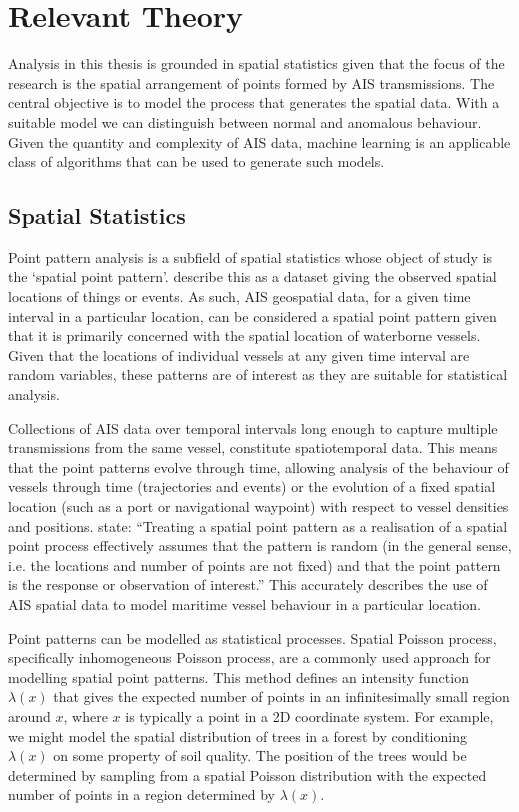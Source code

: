 \documentclass{mldsmsc}
\begin{document}
\section{Relevant Theory}
Analysis in this thesis is grounded in spatial statistics given that the focus of the research is the spatial arrangement of points formed by AIS transmissions. The central objective is to model the process that generates the spatial data. With a suitable model we can distinguish between normal and anomalous behaviour. Given the quantity and complexity of AIS data, machine learning is an applicable class of algorithms that can be used to generate such models.

\subsection{Spatial Statistics}
Point pattern analysis is a subfield of spatial statistics whose object of study is the ‘spatial point pattern’. \cite{baddeley2015spatial} describe this as a dataset giving the observed spatial locations of things or events. As such, AIS geospatial data, for a given time interval in a particular location, can be considered a spatial point pattern given that it is primarily concerned with the spatial location of waterborne vessels. Given that the locations of individual vessels at any given time interval are random variables, these patterns are of interest as they are suitable for statistical analysis.

Collections of AIS data over temporal intervals long enough to capture multiple transmissions from the same vessel, constitute spatiotemporal data. This means that the point patterns evolve through time, allowing analysis of the behaviour of vessels through time (trajectories and events) or the evolution of a fixed spatial location (such as a port or navigational waypoint) with respect to vessel densities and positions.
\cite{baddeley2015spatial} state: “Treating a spatial point pattern as a realisation of a spatial point process effectively assumes that the pattern is random (in the general sense, i.e. the locations and number of points are not fixed) and that the point pattern is the response or observation of interest.” This accurately describes the use of AIS spatial data to model maritime vessel behaviour in a particular location.

Point patterns can be modelled as statistical processes. Spatial Poisson process, specifically inhomogeneous Poisson process, are a commonly used approach for modelling spatial point patterns. This method defines an intensity function \(\lambda(x)\) that gives the expected number of points in an infinitesimally small region around \(x\), where \(x\)  is typically a point in a 2D coordinate system. For example, we might model the spatial distribution of trees in a forest by conditioning \(\lambda(x)\) on some property of soil quality. The position of the trees would be determined by sampling from a spatial Poisson distribution with the expected number of points in a region determined by \(\lambda(x)\). 
\end{document}

